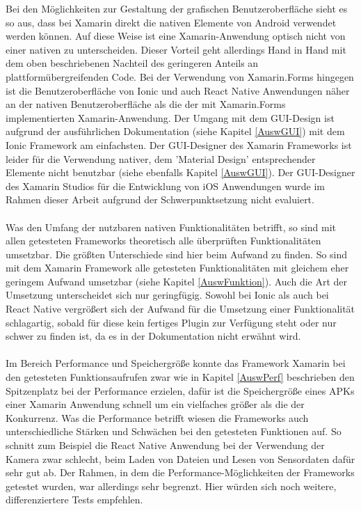 Bei den Möglichkeiten zur Gestaltung der grafischen Benutzeroberfläche sieht es so aus, dass bei Xamarin direkt die nativen Elemente von Android verwendet werden können. Auf diese Weise ist eine Xamarin-Anwendung optisch nicht von einer nativen zu unterscheiden. Dieser Vorteil geht allerdings Hand in Hand mit dem oben beschriebenen Nachteil des geringeren Anteils an plattformübergreifenden Code. Bei der Verwendung von Xamarin.Forms hingegen ist die Benutzeroberfläche von Ionic und auch React Native Anwendungen näher an der nativen Benutzeroberfläche als die der mit Xamarin.Forms implementierten Xamarin-Anwendung. Der Umgang mit dem GUI-Design ist aufgrund der ausführlichen Dokumentation (siehe Kapitel \ref{AuswGUI}) mit dem Ionic Framework am einfachsten. Der GUI-Designer des Xamarin Frameworks ist leider für die Verwendung nativer, dem 'Material Design' entsprechender Elemente nicht benutzbar (siehe ebenfalls Kapitel \ref{AuswGUI}). Der GUI-Designer des Xamarin Studios für die Entwicklung von iOS Anwendungen wurde im Rahmen dieser Arbeit aufgrund der Schwerpunktsetzung nicht evaluiert. 
\\
\\
Was den Umfang der nutzbaren nativen Funktionalitäten betrifft, so sind mit allen getesteten Frameworks theoretisch alle überprüften Funktionalitäten umsetzbar. Die größten Unterschiede sind hier beim Aufwand zu finden. So sind mit dem Xamarin Framework alle getesteten Funktionalitäten mit gleichem eher geringem Aufwand umsetzbar (siehe Kapitel \ref{AuswFunktion}). Auch die Art der Umsetzung unterscheidet sich nur geringfügig. Sowohl bei Ionic als auch bei React Native vergrößert sich der Aufwand für die Umsetzung einer Funktionalität schlagartig, sobald für diese kein fertiges Plugin zur Verfügung steht oder nur schwer zu finden ist, da es in der Dokumentation nicht erwähnt wird.
\\
\\
Im Bereich Performance und Speichergröße konnte das Framework Xamarin bei den getesteten Funktionsaufrufen zwar wie in Kapitel \ref{AuswPerf} beschrieben den Spitzenplatz bei der Performance erzielen, dafür ist die Speichergröße eines APKs einer Xamarin Anwendung schnell um ein vielfaches größer als die der Konkurrenz. Was die Performance betrifft wiesen die Frameworks auch unterschiedliche Stärken und Schwächen bei den getesteten Funktionen auf. So schnitt zum Beispiel die React Native Anwendung bei der Verwendung der Kamera zwar schlecht, beim Laden von Dateien und Lesen von Sensordaten dafür sehr gut ab. Der Rahmen, in dem die Performance-Möglichkeiten der Frameworks getestet wurden, war allerdings sehr begrenzt. Hier würden sich noch weitere, differenziertere Tests empfehlen.
